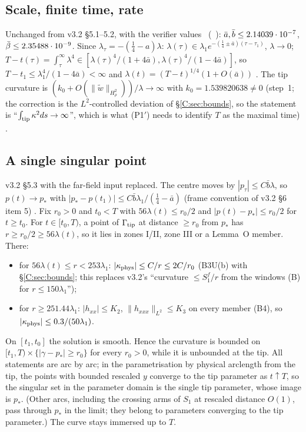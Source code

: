\documentclass[11pt]{article}
\begin{document}
\subsection{Scale, finite time, rate}
Unchanged from v3.2 \S5.1--5.2, with the  verifier values \tC\ (\SV\ ): $\bar a,\bar b\le2.14039\cdot10^{-7}$, $\bar\beta\le2.35488\cdot10^{-9}$. Since $\lambda_\tau=-(\frac14-a)\lambda$: $\lambda(\tau)\in\lambda_1e^{-(\frac14\pm\bar a)(\tau-\tau_1)}$, $\lambda\to0$; $T-t(\tau)=\int_\tau^\infty\lambda^4\in[\lambda(\tau)^4/(1+4\bar a),\lambda(\tau)^4/(1-4\bar a)]$, so $T-t_1\le\lambda_1^4/(1-4\bar a)<\infty$ and $\lambda(t)=(T-t)^{1/4}(1+O(\bar a))$ \tP. The tip curvature is $(k_0+O(\|\tilde w\|_{H^2_\rho}))/\lambda\to\infty$ with $k_0=1.539820638\ne0$ (step~1; the correction is the $L^2$-controlled deviation of \S\ref{C:sec:bounds}, so the statement is ``$\int_{\rm tip}\kappa^2ds\to\infty$'', which is what (P1$'$) needs to identify $T$ as the maximal time) \tP.

\subsection{A single singular point}\label{C:sec:point}
v3.2 \S5.3 with the far-field input replaced. The centre moves by $|p_\tau|\le C\bar b\lambda$, so $p(t)\to p_*$ with $|p_*-p(t_1)|\le C\bar b\lambda_1/(\frac14-\bar a)$ (frame convention of v3.2 \S6 item 5) \tP. Fix $r_0>0$ and $t_0<T$ with $56\lambda(t)\le r_0/2$ and $|p(t)-p_*|\le r_0/2$ for $t\ge t_0$. For $t\in[t_0,T)$, a point of $\Gamma_{\rm tip}$ at distance $\ge r_0$ from $p_*$ has $r\ge r_0/2\ge56\lambda(t)$, so it lies in zones I/II, zone III or a Lemma~O member. There:
\begin{itemize}[leftmargin=*]
\item for $56\lambda(t)\le r<253\lambda_1$: $|\kappa_{\rm phys}|\le C/r\le2C/r_0$ (B3U(b) with \S\ref{C:sec:bounds}; this replaces v3.2's ``curvature $\le S_1^f/r$ from the windows (B) for $r\le150\lambda_1$'');
\item for $r\ge251.44\lambda_1$: $|h_{xx}|\le K_2$, $\|h_{xxx}\|_{L^2}\le K_3$ on every member (B4), so $|\kappa_{\rm phys}|\le0.3/(50\lambda_1)$.
\end{itemize}
On $[t_1,t_0]$ the solution is smooth. Hence the curvature is bounded on $[t_1,T)\times\{|\gamma-p_*|\ge r_0\}$ for every $r_0>0$, while it is unbounded at the tip. All statements are arc by arc; in the parametrisation by physical arclength from the tip, the points with bounded rescaled $y$ converge to the tip parameter as $t\uparrow T$, so the singular set in the parameter domain is the single tip parameter, whose image is $p_*$. (Other arcs, including the crossing arms of $S_1$ at rescaled distance $O(1)$, pass through $p_*$ in the limit; they belong to parameters converging to the tip parameter.) The curve stays immersed up to $T$.
\end{document}
